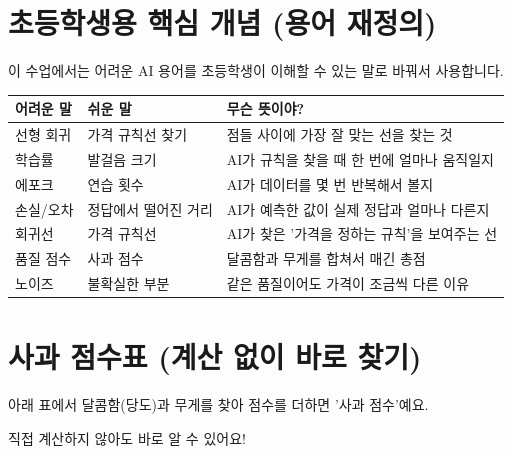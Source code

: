 \documentclass[12pt,a4paper]{article}
\begin{document}
\section{초등학생용 핵심 개념 (용어 재정의)}

\begin{tcolorbox}[colback=lightyellow,colframe=orange,title=\textbf{\texttwemoji{bullseye} 어려운 말을 쉬운 말로 바꾸기}]
이 수업에서는 어려운 AI 용어를 초등학생이 이해할 수 있는 말로 바꿔서 사용합니다.
\end{tcolorbox}

\begin{center}
\begin{tabular}{|p{3cm}|p{3.5cm}|p{7cm}|}
\hline
\textbf{어려운 말} & \textbf{쉬운 말} & \textbf{무슨 뜻이야?} \\
\hline
선형 회귀 & 가격 규칙선 찾기 & 점들 사이에 가장 잘 맞는 선을 찾는 것 \\
\hline
학습률 & 발걸음 크기 & AI가 규칙을 찾을 때 한 번에 얼마나 움직일지 \\
\hline
에포크 & 연습 횟수 & AI가 데이터를 몇 번 반복해서 볼지 \\
\hline
손실/오차 & 정답에서 떨어진 거리 & AI가 예측한 값이 실제 정답과 얼마나 다른지 \\
\hline
회귀선 & 가격 규칙선 & AI가 찾은 '가격을 정하는 규칙'을 보여주는 선 \\
\hline
품질 점수 & 사과 점수 & 달콤함과 무게를 합쳐서 매긴 총점 \\
\hline
노이즈 & 불확실한 부분 & 같은 품질이어도 가격이 조금씩 다른 이유 \\
\hline
\end{tabular}
\end{center}

\section{사과 점수표 (계산 없이 바로 찾기)}

\begin{tcolorbox}[colback=lightblue,colframe=darkblue,title=\textbf{\texttwemoji{clipboard} 복잡한 계산 대신 '점수표'를 사용해요!}]
아래 표에서 달콤함(당도)과 무게를 찾아 점수를 더하면 '사과 점수'예요.

직접 계산하지 않아도 바로 알 수 있어요!
\end{tcolorbox}
\end{document}
